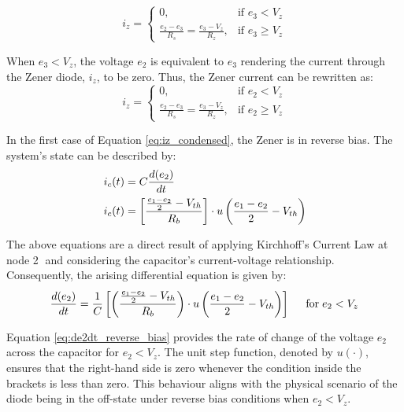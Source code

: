 \begin{equation}
	i_z = \begin{cases}
		0, & \text{if } e_3 < V_z \\
		\frac{e_2 - e_3}{R_s}=\frac{e_3 - V_z}{R_z}, & \text{if } e_3 \geq V_z
	\end{cases}
    \label{eq:iz_reverse_bias}
\end{equation}

When $e_3 < V_z$, the voltage $e_2$ is equivalent to $e_3$ rendering the current through the Zener diode, $i_z$, to be zero. Thus, the Zener current can be rewritten as:
\begin{equation}
    i_z=\begin{cases}
        0,  & \text{if } e_2 < V_z \\
        \frac{e_2-e_3}{R_s}=\frac{e_3-V_z}{R_z}, & \text{if } e_2 \geq V_z
    \end{cases}
    \label{eq:iz_condensed}
\end{equation}

In the first case of Equation \ref{eq:iz_condensed}, the Zener is in reverse bias. The system's state can be described by:
\begin{equation}
    \begin{split}
        i_c(t) &= C\frac{d(e_2)}{dt} \\
        i_c(t) &= \left[\frac{\frac{e_1 - e_2}{2} - V_{th}}{R_b} \right]\cdot u\left(\frac{e_1 - e_2}{2} - V_{th} \right)
    \end{split}
    \label{eq:ic_reverse_bias}
\end{equation}

\pagebreak
The above equations are a direct result of applying Kirchhoff's Current Law at node \textcircled{2} and considering the capacitor's current-voltage relationship. Consequently, the arising differential equation is given by:
\begin{equation}
     \frac{d(e_2)}{dt}=\frac{1}{C} \left[\left(\frac{\frac{e_1 - e_2}{2} - V_{th}}{R_b} \right) \cdot u\left(\frac{e_1-e_2}{2}-V_{th} \right) \right] \hspace{0.5cm} \text{for} \hspace{0.1cm} e_2 < V_z
    \label{eq:de2dt_reverse_bias}
\end{equation}

Equation \ref{eq:de2dt_reverse_bias} provides the rate of change of the voltage $e_2$ across the capacitor for $e_2 < V_z$. The unit step function, denoted by $u(\cdot)$, ensures that the right-hand side is zero whenever the condition inside the brackets is less than zero. This behaviour aligns with the physical scenario of the diode being in the off-state under reverse bias conditions when $e_2 < V_z$.

